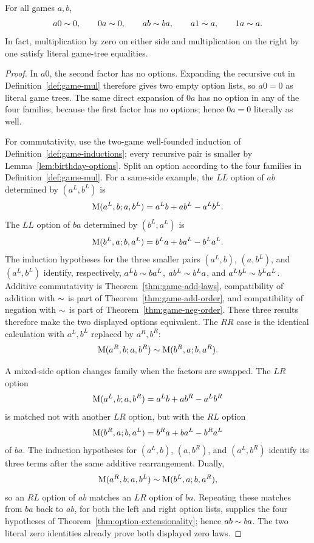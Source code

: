\begin{theorem}
  \label{thm:game-mul-laws}
  \leanok
  For all games \(a,b\),
  \[
    a0\sim0,\qquad 0a\sim0,\qquad ab\sim ba,
    \qquad a1\sim a,\qquad 1a\sim a.
  \]
  In fact, multiplication by zero on either side and multiplication on the right by one
  satisfy literal game-tree equalities.
\end{theorem}
\begin{proof}
  \leanok
  In \(a0\), the second factor has no options.  Expanding the recursive cut in
  Definition~\ref{def:game-mul} therefore gives two empty option lists, so
  \(a0=0\) as literal game trees.
  The same direct expansion of \(0a\) has no option in any of the four
  families, because the first factor has no options; hence \(0a=0\) literally
  as well.

  For commutativity, use the two-game well-founded induction of
  Definition~\ref{def:game-inductions}; every recursive pair is smaller by
  Lemma~\ref{lem:birthday-options}.  Split an option according to the four
  families in Definition~\ref{def:game-mul}.  For a same-side example, the
  \(LL\) option of
  \(ab\) determined by \((a^L,b^L)\) is
  \[
    \operatorname{M}(a^L,b;a,b^L)=a^Lb+ab^L-a^Lb^L.
  \]
  The \(LL\) option of \(ba\) determined by \((b^L,a^L)\) is
  \[
    \operatorname{M}(b^L,a;b,a^L)=b^La+ba^L-b^La^L.
  \]
  The induction hypotheses for the three smaller pairs
  \((a^L,b)\), \((a,b^L)\), and \((a^L,b^L)\) identify, respectively,
  \(a^Lb\sim ba^L\), \(ab^L\sim b^La\), and
  \(a^Lb^L\sim b^La^L\).  Additive commutativity is
  Theorem~\ref{thm:game-add-laws}, compatibility of addition with
  \(\sim\) is part of Theorem~\ref{thm:game-add-order}, and compatibility
  of negation with \(\sim\) is part of
  Theorem~\ref{thm:game-neg-order}.  These three results therefore make the
  two displayed options equivalent.  The \(RR\) case is the identical
  calculation with
  \(a^L,b^L\) replaced by \(a^R,b^R\):
  \[
    \operatorname{M}(a^R,b;a,b^R)\sim\operatorname{M}(b^R,a;b,a^R).
  \]

  A mixed-side option changes family when the factors are swapped.  The
  \(LR\) option
  \[
    \operatorname{M}(a^L,b;a,b^R)=a^Lb+ab^R-a^Lb^R
  \]
  is matched not with another \(LR\) option, but with the \(RL\) option
  \[
    \operatorname{M}(b^R,a;b,a^L)=b^Ra+ba^L-b^Ra^L
  \]
  of \(ba\).  The induction hypotheses for \((a^L,b)\), \((a,b^R)\), and
  \((a^L,b^R)\) identify its three terms after the same additive
  rearrangement.  Dually,
  \[
    \operatorname{M}(a^R,b;a,b^L)\sim\operatorname{M}(b^L,a;b,a^R),
  \]
  so an \(RL\) option of \(ab\) matches an \(LR\) option of \(ba\).
  Repeating these matches from \(ba\) back to \(ab\), for both the left and
  right option lists, supplies the four hypotheses of
  Theorem~\ref{thm:option-extensionality}; hence \(ab\sim ba\).  The two
  literal zero identities already prove both displayed zero laws.


\end{proof}
